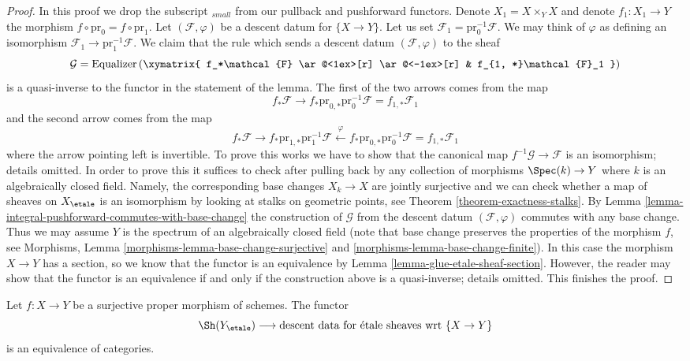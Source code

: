 \begin{proof}
In this proof we drop the subscript ${}_{small}$ from our pullback
and pushforward functors.
Denote $X_1 = X \times_Y X$ and denote $f_1 : X_1 \to Y$ the
morphism $f \circ \text{pr}_0 = f \circ \text{pr}_1$.
Let $(\mathcal{F}, \varphi)$ be a descent datum for $\{X \to Y\}$.
Let us set $\mathcal{F}_1 = \text{pr}_0^{-1}\mathcal{F}$.
We may think of $\varphi$ as defining an isomorphism
$\mathcal{F}_1 \to \text{pr}_1^{-1}\mathcal{F}$.
We claim that the rule which sends a descent datum
$(\mathcal{F}, \varphi)$
to the sheaf
$$
\mathcal{G} =
\text{Equalizer}\left(
\xymatrix{
f_*\mathcal{F}
\ar@<1ex>[r] \ar@<-1ex>[r] &
f_{1, *}\mathcal{F}_1
}
\right)
$$
is a quasi-inverse to the functor in the statement of the lemma.
The first of the two arrows comes from the map
$$
f_*\mathcal{F} \to
f_*\text{pr}_{0, *}\text{pr}_0^{-1}\mathcal{F} =
f_{1, *}\mathcal{F}_1
$$
and the second arrow comes from the map
$$
f_*\mathcal{F} \to
f_* \text{pr}_{1, *}\text{pr}_1^{-1}\mathcal{F}
\xleftarrow{\varphi}
f_* \text{pr}_{0, *} \text{pr}_0^{-1}\mathcal{F} =
f_{1, *}\mathcal{F}_1
$$
where the arrow pointing left is invertible.
To prove this works we have to show
that the canonical map $f^{-1}\mathcal{G} \to \mathcal{F}$
is an isomorphism; details omitted. In order to prove this it
suffices to check after pulling back by any collection of morphisms
$\Spec(k) \to Y$ where $k$ is an algebraically closed field.
Namely, the corresponding base changes $X_k \to X$ are jointly
surjective and we can check whether a map of sheaves on $X_\etale$
is an isomorphism by looking at stalks on geometric points, see
Theorem \ref{theorem-exactness-stalks}.
By Lemma \ref{lemma-integral-pushforward-commutes-with-base-change}
the construction of $\mathcal{G}$ from the descent datum
$(\mathcal{F}, \varphi)$ commutes with any base change.
Thus we may assume $Y$ is the spectrum of an algebraically
closed field (note that base change preserves the properties
of the morphism $f$, see
Morphisms, Lemma \ref{morphisms-lemma-base-change-surjective}
and \ref{morphisms-lemma-base-change-finite}).
In this case the morphism $X \to Y$ has a section, so we
know that the functor is an equivalence by
Lemma \ref{lemma-glue-etale-sheaf-section}.
However, the reader may show that the functor is an equivalence
if and only if the construction above is a quasi-inverse;
details omitted. This finishes the proof.
\end{proof}

\begin{lemma}
\label{lemma-glue-etale-sheaf-proper-surjective}
Let $f : X \to Y$ be a surjective proper morphism of schemes.
The functor
$$
\Sh(Y_\etale)
\longrightarrow
\text{descent data for \'etale sheaves wrt }\{X \to Y\}
$$
is an equivalence of categories.
\end{lemma}

